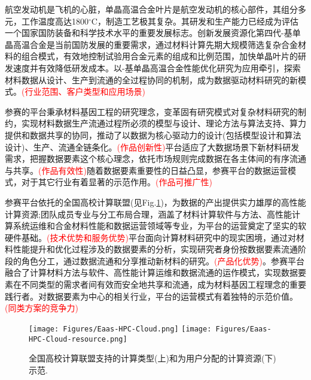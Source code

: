 航空发动机是飞机的心脏，单晶高温合金叶片是航空发动机的核心部件，其组分多元，工作温度高达1800$^{\circ}\mathrm{C}$，制造工艺极其复杂。其研发和生产能力已经成为评估一个国家国防装备和科学技术水平的重要发展标志。创新发展资源化第四代-基单晶高温合金是当前国防发展的重要需求，通过材料计算先期大规模筛选复杂合金材料的组合模式，有效地控制试验用合金元素的组成和比例范围，加快单晶叶片的研发速度并有效降低研发成本。以-基单晶高温合金性能优化研究为应用牵引，探索材料数据从设计、生产到流通的全过程协同的机制，成为数据驱动材料研究的新模式。\textcolor{red}{(行业范围、客户类型和应用场景)}

参赛的平台秉承材料基因工程的研究理念，变革固有研究模式对复杂材料研究的制约，实现材料数据生产流通过程所必须的模型与设计、理论方法与算法支持、算力提供和数据共享的协同，推动了以数据为核心驱动力的设计(包括模型设计和算法设计)、生产、流通全链条化。\textcolor{red}{(作品创新性)}平台适应了大数据场景下新材料研发需求，把握数据要素这个核心理念，依托市场规则完成数据在各主体间的有序流通与共享。\textcolor{red}{(作品有效性)}随着数据要素重要性的日益凸显，参赛平台的数据运营模式，对于其它行业有着显著的示范作用。\textcolor{red}{(作品可推广性)}

参赛平台依托的全国高校计算联盟(见\textrm{Fig.}\ref{Fig:Eaas-HPC})，为数据的产出提供实力雄厚的高性能计算资源;团队成员专业与分工布局合理，涵盖了材料计算软件与方法、高性能计算系统运维和合金材料性能和数据运营领域等专业，为平台的运营奠定了坚实的软硬件基础。\textcolor{red}{(技术优势和服务优势)}平台面向计算材料研究中的现实困境，通过对材料性能提升和优化过程涉及的数据要素的分析，实现研究者身份按数据要素流通阶段的角色分工，通过数据流通和分享推动新材料的研究。\textcolor{red}{(产品化优势)}。参赛平台融合了计算材料方法与软件、高性能计算运维和数据流通的运作模式，实现数据要素在不同类型的需求者间有效而安全地共享和流通，成为材料基因工程理念的重要践行者。对数据要素为中心的相关行业，平台的运营模式有着独特的示范价值。\textcolor{red}{(同类方案的竞争力)}

\begin{figure}[h!]
\centering
\vspace*{-0.05in}
\texttt{[image: Figures/Eaas-HPC-Cloud.png]}
\vskip 2pt
\texttt{[image: Figures/Eaas-HPC-Cloud-resource.png]}
\caption{全国高校计算联盟支持的计算类型(上)和为用户分配的计算资源(下)示范.}
\label{Fig:Eaas-HPC}
\end{figure}



